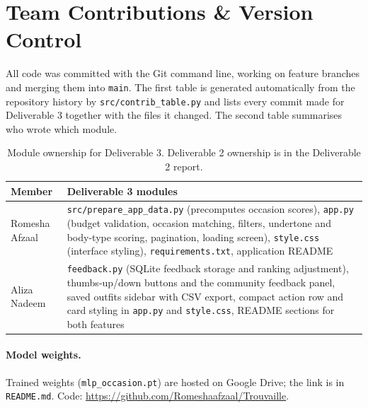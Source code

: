 \section{Team Contributions \& Version Control}
All code was committed with the Git command line, working on feature branches and merging them into \texttt{main}. The first table is generated automatically from the repository history by \texttt{src/contrib\_table.py} and lists every commit made for Deliverable 3 together with the files it changed. The second table summarises who wrote which module.

{\small
{}
}

\begin{table}[htbp]
\centering
\small
\begin{tabular}{p{3cm}p{10.5cm}}
\toprule
Member & Deliverable 3 modules \\
\midrule
Romesha Afzaal & \texttt{src/prepare\_app\_data.py} (precomputes occasion scores), \texttt{app.py} (budget validation, occasion matching, filters, undertone and body-type scoring, pagination, loading screen), \texttt{style.css} (interface styling), \texttt{requirements.txt}, application README \\
Aliza Nadeem & \texttt{feedback.py} (SQLite feedback storage and ranking adjustment), thumbs-up/down buttons and the community feedback panel, saved outfits sidebar with CSV export, compact action row and card styling in \texttt{app.py} and \texttt{style.css}, README sections for both features \\
\bottomrule
\end{tabular}
\caption{Module ownership for Deliverable 3. Deliverable 2 ownership is in the Deliverable 2 report.}
\end{table}

\paragraph{Model weights.} Trained weights (\texttt{mlp\_occasion.pt}) are hosted on Google Drive; the link is in \texttt{README.md}. Code: \url{https://github.com/Romeshaafzaal/Trouvaille}.
